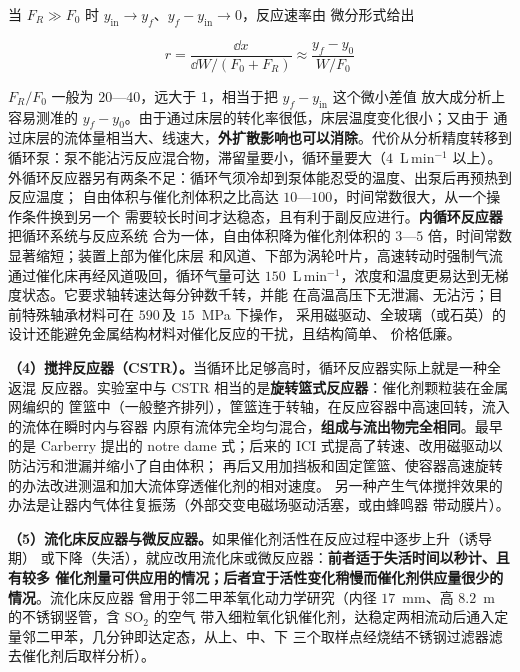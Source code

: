 当 $F_R\gg F_0$ 时 $y_{\mathrm{in}}\to y_f$、$y_f-y_{\mathrm{in}}\to 0$，反应速率由
微分形式给出

\begin{equation}
r=\frac{\dd x}{\dd W/(F_0+F_R)}\approx\frac{y_f-y_0}{W/F_0}
\label{eq:recycle-r}
\end{equation}

$F_R/F_0$ 一般为 $20$—$40$，远大于 1，相当于把 $y_f-y_{\mathrm{in}}$ 这个微小差值
放大成分析上容易测准的 $y_f-y_0$。由于通过床层的转化率很低，床层温度变化很小；又由于
通过床层的流体量相当大、线速大，\textbf{外扩散影响也可以消除}。代价从分析精度转移到
循环泵：泵不能沾污反应混合物，滞留量要小，循环量要大（$4$~L\,min$^{-1}$ 以上）。
外循环反应器另有两条不足：循环气须冷却到泵体能忍受的温度、出泵后再预热到反应温度；
自由体积与催化剂体积之比高达 $10$—$100$，时间常数很大，从一个操作条件换到另一个
需要较长时间才达稳态，且有利于副反应进行。\textbf{内循环反应器}把循环系统与反应系统
合为一体，自由体积降为催化剂体积的 $3$—$5$ 倍，时间常数显著缩短；装置上部为催化床层
和风道、下部为涡轮叶片，高速转动时强制气流通过催化床再经风道吸回，循环气量可达
$150$~L\,min$^{-1}$，浓度和温度更易达到无梯度状态。它要求轴转速达每分钟数千转，并能
在高温高压下无泄漏、无沾污；目前特殊轴承材料可在 $590$\,\degC 及 $15$~MPa 下操作，
采用磁驱动、全玻璃（或石英）的设计还能避免金属结构材料对催化反应的干扰，且结构简单、
价格低廉。

\textbf{（4）搅拌反应器（CSTR）。}当循环比足够高时，循环反应器实际上就是一种全返混
反应器。实验室中与 CSTR 相当的是\textbf{旋转篮式反应器}：催化剂颗粒装在金属网编织的
筐篮中（一般整齐排列），筐篮连于转轴，在反应容器中高速回转，流入的流体在瞬时内与容器
内原有流体完全均匀混合，\textbf{组成与流出物完全相同}。最早的是 Carberry 提出的
notre dame 式；后来的 ICI 式提高了转速、改用磁驱动以防沾污和泄漏并缩小了自由体积；
再后又用加挡板和固定筐篮、使容器高速旋转的办法改进测温和加大流体穿透催化剂的相对速度。
另一种产生气体搅拌效果的办法是让器内气体往复振荡（外部交变电磁场驱动活塞，或由蜂鸣器
带动膜片）。

\textbf{（5）流化床反应器与微反应器。}如果催化剂活性在反应过程中逐步上升（诱导期）
或下降（失活），就应改用流化床或微反应器：\textbf{前者适于失活时间以秒计、且有较多
催化剂量可供应用的情况；后者宜于活性变化稍慢而催化剂供应量很少的情况}。流化床反应器
曾用于邻二甲苯氧化动力学研究（内径 $17$~mm、高 $8.2$~m 的不锈钢竖管，含 SO$_2$ 的空气
带入细粒氧化钒催化剂，达稳定两相流动后通入定量邻二甲苯，几分钟即达定态，从上、中、下
三个取样点经烧结不锈钢过滤器滤去催化剂后取样分析）。


